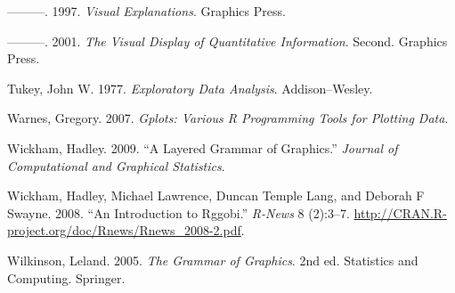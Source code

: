 \leavevmode\hypertarget{ref-tufte:1997}{}%
---------. 1997. \emph{Visual Explanations}. Graphics Press.

\leavevmode\hypertarget{ref-tufte:2001}{}%
---------. 2001. \emph{The Visual Display of Quantitative Information}.
Second. Graphics Press.

\leavevmode\hypertarget{ref-tukey:1977}{}%
Tukey, John W. 1977. \emph{Exploratory Data Analysis}. Addison--Wesley.

\leavevmode\hypertarget{ref-gplots}{}%
Warnes, Gregory. 2007. \emph{Gplots: Various R Programming Tools for
Plotting Data}.

\leavevmode\hypertarget{ref-wickham:2007d}{}%
Wickham, Hadley. 2009. ``A Layered Grammar of Graphics.'' \emph{Journal
of Computational and Graphical Statistics}.

\leavevmode\hypertarget{ref-wickham:2008b}{}%
Wickham, Hadley, Michael Lawrence, Duncan Temple Lang, and Deborah F
Swayne. 2008. ``An Introduction to Rggobi.'' \emph{R-News} 8 (2):3--7.
\url{http://CRAN.R-project.org/doc/Rnews/Rnews_2008-2.pdf}.

\leavevmode\hypertarget{ref-wilkinson:2006}{}%
Wilkinson, Leland. 2005. \emph{The Grammar of Graphics}. 2nd ed.
Statistics and Computing. Springer.
